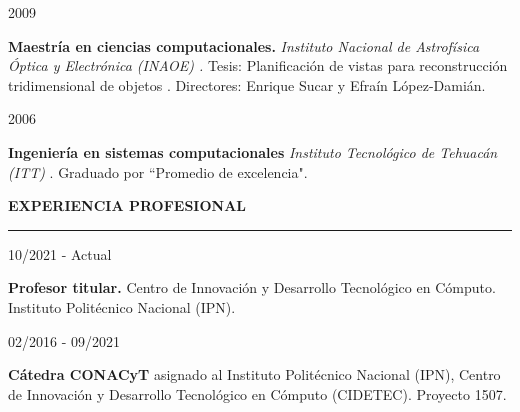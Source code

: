 \documentclass[10pt]{article}
\begin{document}
\begin{minipage}{1.5 in}
	2009\\
\end{minipage}
\begin{minipage}{4.5in}
	\textbf{Maestría en ciencias computacionales.} \textit{Instituto Nacional de Astrofísica Óptica y Electrónica (INAOE) \href{https://www.inaoep.mx/}{\faExternalLink}.} Tesis: Planificación de vistas para reconstrucción tridimensional de objetos \href{https://jivasquez.files.wordpress.com/2015/03/tesis-maestria.pdf}{\faFilePdfO}. Directores: Enrique Sucar y Efraín López-Damián.\\ 
\end{minipage}

\begin{minipage}{1.5 in}
	2006\\
\end{minipage}
\begin{minipage}{4.5in}
	\textbf{Ingeniería en sistemas computacionales} \textit{Instituto Tecnológico de Tehuacán (ITT)} \href{http://www.ittehuacan.edu.mx/}{\faExternalLink}. Graduado por ``Promedio de excelencia".\\ 
\end{minipage} 


{\bf EXPERIENCIA PROFESIONAL}
\vspace{3pt}
\hrule

\begin{minipage}{1.5 in}
	10/2021 - Actual\\
\end{minipage}
\begin{minipage}{4.5in}
	\textbf{Profesor titular.} Centro de Innovación y Desarrollo Tecnológico en Cómputo. Instituto Politécnico Nacional (IPN).\\ 
\end{minipage}

\begin{minipage}{1.5 in}
	02/2016 - 09/2021\\
\end{minipage}
\begin{minipage}{4.5in}
	\textbf{Cátedra CONACyT} asignado al Instituto Politécnico Nacional (IPN), Centro de Innovación y Desarrollo Tecnológico en Cómputo (CIDETEC). Proyecto 1507.\\ 
\end{minipage}

\end{document}
